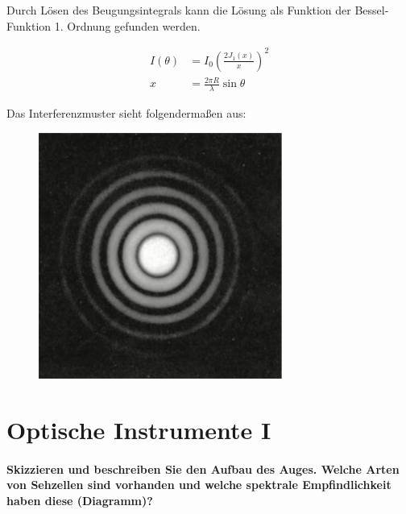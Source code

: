 \documentclass[a4paper, 11pt, ngerman, parskip=half-]{scrartcl}
\begin{document}
    Durch Lösen des Beugungsintegrals kann die Lösung als Funktion der Bessel-Funktion 1. Ordnung gefunden werden.

    \begin{align*}
        I(\theta) & = I_0 (\frac{2 J_1(x)}{x})^2          \\
        x         & = \frac{2 \pi R}{\lambda} \sin \theta
    \end{align*}

    Das Interferenzmuster sieht folgendermaßen aus:
    \begin{figure}[H]
        \centering
        \includegraphics[width=8cm]{image/19/6}
    \end{figure}

    \newpage

    \section{Optische Instrumente I}

    \paragraph{Skizzieren und beschreiben Sie den Aufbau des Auges. Welche Arten von Sehzellen sind
        vorhanden und welche spektrale Empfindlichkeit haben diese (Diagramm)?} ~
\end{document}
